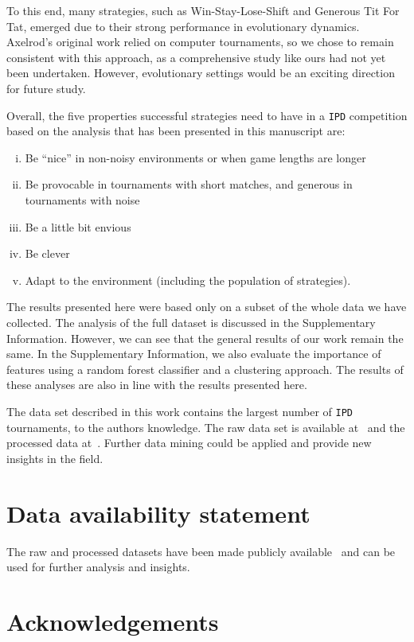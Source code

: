 \documentclass{article}
\def\IPD{\texttt{IPD}}
\begin{document}
To this end, many strategies, such as Win-Stay-Lose-Shift and Generous
Tit For Tat, emerged due to their strong performance in evolutionary dynamics.
Axelrod's original work relied on computer tournaments, so we chose to remain
consistent with this approach, as a comprehensive study like ours had not yet
been undertaken. However, evolutionary settings would be an exciting direction
for future study.

Overall, the five properties successful strategies need to have in a \IPD{} competition
based on the analysis that has been presented in this manuscript are:

\begin{enumerate}[(i)]
    \item Be ``nice'' in non-noisy environments or when game lengths are longer
    \item Be provocable in tournaments with short matches, and generous in tournaments with noise
    \item Be a little bit envious
    \item Be clever
    \item Adapt to the environment (including the population of strategies).
\end{enumerate}

The results presented here were based only on a subset of the whole data we have
collected. The analysis of the full dataset is discussed in the Supplementary Information.
However, we can see that the general results of our work remain the same. In the
Supplementary Information, we also evaluate the importance of features using a
random forest classifier and a clustering approach. The results of these
analyses are also in line with the results presented here.

The data set described in this work contains the largest number of \IPD{}
tournaments, to the authors knowledge. The raw data set is available
at~\cite{raw_data} and the processed data at~\cite{data}. Further data mining
could be applied and provide new insights in the field.

\section{Data availability statement}

The raw and processed datasets have been made publicly available~\cite{data,
raw_data} and can be used for further analysis and insights.

\section{Acknowledgements}
\end{document}
